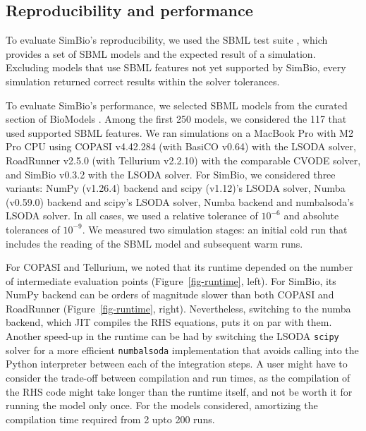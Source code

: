 \documentclass{article}
\begin{document}
\hypertarget{reproducibility-and-performance}{%
\subsection{Reproducibility and
performance}\label{reproducibility-and-performance}}

To evaluate SimBio's reproducibility,
we used the \ac{SBML} test suite \cite{SBMLTestSuite},
which provides a set of \ac{SBML} models
and the expected result of a simulation.
Excluding models that use \ac{SBML} features not yet supported by SimBio,
every simulation returned correct results within the solver tolerances.

To evaluate SimBio's performance,
we selected \ac{SBML} models from the curated section of BioModels \cite{malik-sheriffBioModels15Years2020}.
Among the first 250 models,
we considered the 117 that used supported \ac{SBML} features.
We ran simulations
on a MacBook Pro with M2 Pro CPU
using
COPASI v4.42.284
(with BasiCO v0.64) with the LSODA solver,
RoadRunner v2.5.0 (with Tellurium v2.2.10) with the comparable CVODE solver, and
SimBio v0.3.2 with the LSODA solver.
For SimBio, we considered three variants:
NumPy (v1.26.4) backend and scipy (v1.12)'s LSODA solver,
Numba (v0.59.0) backend and scipy's LSODA solver,
Numba backend and numbalsoda's LSODA solver.
In all cases, we used a relative tolerance of \(10^{-6}\) and absolute tolerances of \(10^{-9}\).
We measured two simulation stages:
an initial cold run that includes the reading of the \ac{SBML} model
and subsequent warm runs.

For COPASI and Tellurium,
we noted that its runtime depended on the number of intermediate evaluation points (Figure~\ref{fig-runtime}, left).
For SimBio,
its NumPy backend can be orders of magnitude slower than both COPASI and RoadRunner  (Figure~\ref{fig-runtime}, right).
Nevertheless, switching to the numba backend,
which \ac{JIT} compiles the \ac{RHS} equations,
puts it on par with them.
Another speed-up in the runtime can be had by switching the LSODA \texttt{scipy} solver
for a more efficient \texttt{numbalsoda} implementation that avoids calling into the Python interpreter
between each of the integration steps.
A user might have to consider the trade-off between compilation and run times,
as the compilation of the \ac{RHS} code might take longer than the runtime itself,
and not be worth it for running the model only once.
For the models considered,
amortizing the compilation time required from 2 upto 200 runs.
\end{document}
